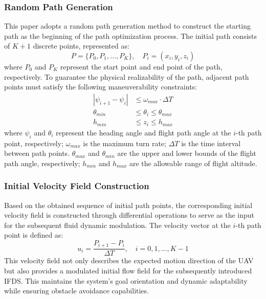 \documentclass[final,3p,times,numbers]{elsarticle}
\begin{document}
\subsubsection{Random Path Generation}
This paper adopts a random path generation method to construct the starting path as the beginning of the path optimization process. The initial path consists of $K+1$ discrete points, represented as:
\begin{equation}
P = \{P_0, P_1, \dots, P_K\}, \quad P_i = (x_i, y_i, z_i) \label{eq:3-5}
\end{equation}
where $P_0$ and $P_K$ represent the start point and end point of the path, respectively. To guarantee the physical realizability of the path, adjacent path points must satisfy the following maneuverability constraints:
\begin{equation}
\begin{aligned}
|\psi_{i+1} - \psi_i| &\le \omega_{max} \cdot \Delta T \\
\theta_{min} &\le \theta_i \le \theta_{max} \\
h_{min} &\le z_i \le h_{max}
\end{aligned} \label{eq:3-6}
\end{equation}
where $\psi_i$ and $\theta_i$ represent the heading angle and flight path angle at the $i$-th path point, respectively; $\omega_{max}$ is the maximum turn rate; $\Delta T$ is the time interval between path points. $\theta_{max}$ and $\theta_{min}$ are the upper and lower bounds of the flight path angle, respectively; $h_{min}$ and $h_{max}$ are the allowable range of flight altitude.

\subsubsection{Initial Velocity Field Construction}
Based on the obtained sequence of initial path points, the corresponding initial velocity field is constructed through differential operations to serve as the input for the subsequent fluid dynamic modulation. The velocity vector at the $i$-th path point is defined as:
\begin{equation}
u_i = \frac{P_{i+1} - P_i}{\Delta T}, \quad i = 0, 1, \dots, K-1 \label{eq:3-7}
\end{equation}
This velocity field not only describes the expected motion direction of the UAV but also provides a modulated initial flow field for the subsequently introduced IFDS. This maintains the system's goal orientation and dynamic adaptability while ensuring obstacle avoidance capabilities.
\end{document}
